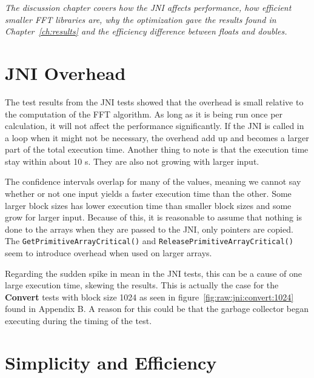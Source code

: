 \textit{The discussion chapter covers how the JNI affects performance, how efficient smaller FFT libraries are, why the optimization gave the results found in Chapter~\ref{ch:results} and the efficiency difference between floats and doubles.}

\section{JNI Overhead}
The test results from the JNI tests showed that the overhead is small relative to the computation of the FFT algorithm. As long as it is being run once per calculation, it will not affect the performance significantly. If the JNI is called in a loop when it might not be necessary, the overhead add up and becomes a larger part of the total execution time. Another thing to note is that the execution time stay within about 10 \textmu s. They are also not growing with larger input.

The confidence intervals overlap for many of the values, meaning we cannot say whether or not one input yields a faster execution time than the other. Some larger block sizes has lower execution time than smaller block sizes and some grow for larger input. Because of this, it is reasonable to assume that nothing is done to the arrays when they are passed to the JNI, only pointers are copied. The \texttt{GetPrimitiveArrayCritical()} and \texttt{ReleasePrimitiveArrayCritical()} seem to introduce overhead when used on larger arrays. %

Regarding the sudden spike in mean in the JNI tests, this can be a cause of one large execution time, skewing the results. This is actually the case for the \textbf{Convert} tests with block size 1024 as seen in figure~\ref{fig:raw:jni:convert:1024} found in Appendix B. A reason for this could be that the garbage collector began executing during the timing of the test.


\section{Simplicity and Efficiency} %



